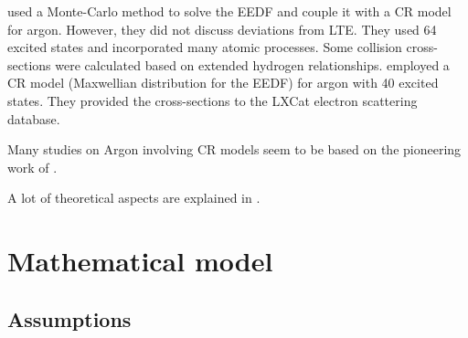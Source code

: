 \cite{bogaerts1998collisional} used a Monte-Carlo method to solve the EEDF and couple it with a CR model for argon. However, they did not discuss deviations from LTE.   They used 64 excited states and incorporated many atomic processes. Some collision cross-sections were calculated based on extended hydrogen relationships. \cite{gangwar2012argon} employed a CR model (Maxwellian distribution for the EEDF) for argon with 40 excited states. They provided the cross-sections to the LXCat electron scattering database. 

Many studies on Argon involving CR models seem to be based on the pioneering work of \cite{vlcek1989collisional,vlcek1991collisional}. 

A lot of theoretical aspects are explained in \citep{li2013numerical}.


\section{Mathematical model} \label{sec:MathModel}


\subsection{Assumptions} \label{sec:Assumptions}

